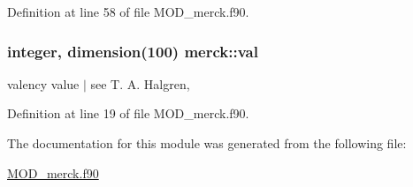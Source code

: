 Definition at line 58 of file M\-O\-D\-\_\-merck.\-f90.

\hypertarget{classmerck_a0bc0ef340bd3d358ede6d66a415952a3}{
\subsubsection[{val}]{\setlength{\rightskip}{0pt plus 5cm}integer, dimension(100) merck\-::val}}\label{classmerck_a0bc0ef340bd3d358ede6d66a415952a3}


valency value $|$ see T. A. Halgren, 



Definition at line 19 of file M\-O\-D\-\_\-merck.\-f90.



The documentation for this module was generated from the following file\-:\begin{DoxyCompactItemize}
\item 
\hyperlink{MOD__merck_8f90}{M\-O\-D\-\_\-merck.\-f90}\end{DoxyCompactItemize}
